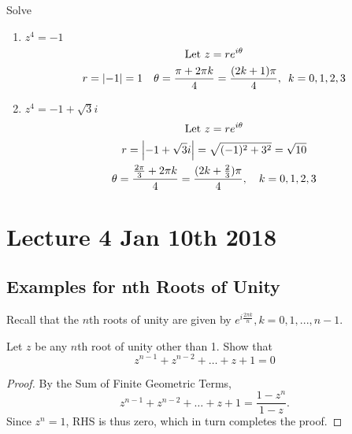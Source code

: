 \documentclass[11pt, oneside]{book}
\begin{document}
\begin{ex}
	Solve
	\begin{enumerate}
		\item $z^4 = -1$
			\begin{gather*}
				\text{Let } z = re^{i \theta} \\
				r = \left|-1\right| = 1 \quad \theta = \frac{\pi + 2 \pi k}{4} = \frac{(2k + 1) \pi}{4}, \enspace k = 0, 1, 2, 3
			\end{gather*}
		\item $z^4 = -1 + \sqrt{3} i$
			\begin{gather*}
				\text{Let } z = re^{i \theta} \\
				r = \left|-1 + \sqrt{3} i\right| = \sqrt{(-1)^2 + 3^2} = \sqrt{10} \\
				\theta = \frac{\frac{2\pi}{3} + 2\pi k}{4} = \frac{(2k + \frac{2}{3}) \pi}{4}, \quad k = 0, 1, 2, 3  
			\end{gather*}
	\end{enumerate}
\end{ex}




\chapter{Lecture 4 Jan 10th 2018}
	\label{chapter:lecture_4_jan_10th_2018}

\section{Examples for nth Roots of Unity} %
\label{sec:examples_for_nth_roots_of_unity}

Recall that the $n$th roots of unity are given by $e^{i \frac{2\pi k}{n}}, k = 0, 1, ..., n - 1$.

\begin{ex}\label{ex:sum of root of unity other than one is negative one}
	Let $z$ be any $n$th root of unity other than 1. Show that
	\begin{equation}
		z^{n - 1} + z^{n - 2} + \hdots + z + 1 = 0
	\end{equation}

	\begin{proof}
		By the Sum of Finite Geometric Terms,
		\begin{equation*}
			z^{n - 1} + z^{n - 2} + \hdots + z + 1 = \frac{1 - z^n}{1 - z}.
		\end{equation*}
		Since $z^n = 1$, RHS is thus zero, which in turn completes the proof.
	\end{proof}
\end{ex}
\end{document}
